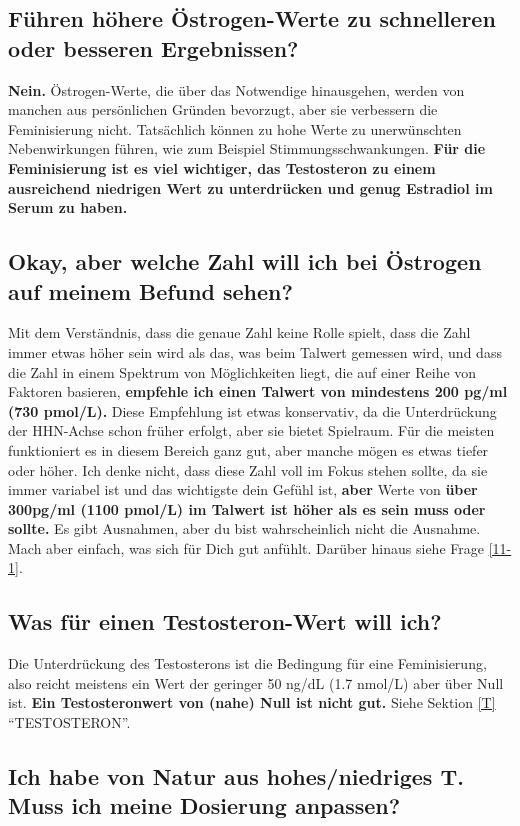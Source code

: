 \documentclass{article}
\begin{document}
\subsection{Führen höhere Östrogen-Werte zu schnelleren oder besseren Ergebnissen?}

\textbf{Nein.} Östrogen-Werte, die über das Notwendige hinausgehen, werden von manchen aus persönlichen Gründen bevorzugt, aber sie verbessern die Feminisierung nicht. Tatsächlich können zu hohe Werte zu unerwünschten Nebenwirkungen führen, wie zum Beispiel Stimmungsschwankungen. \textbf{Für die Feminisierung ist es viel wichtiger, das Testosteron zu einem ausreichend niedrigen Wert zu unterdrücken und genug Estradiol im Serum zu haben.}

\subsection{Okay, aber welche Zahl will ich bei Östrogen auf meinem Befund sehen?}

Mit dem Verständnis, dass die genaue Zahl keine Rolle spielt, dass die Zahl immer etwas höher sein wird als das, was beim Talwert gemessen wird, und dass die Zahl in einem Spektrum von Möglichkeiten liegt, die auf einer Reihe von Faktoren basieren, \textbf{empfehle ich einen Talwert von mindestens 200 pg/ml (730 pmol/L).} Diese Empfehlung ist etwas konservativ, da die Unterdrückung der HHN-Achse schon früher erfolgt, aber sie bietet Spielraum. Für die meisten funktioniert es in diesem Bereich ganz gut, aber manche mögen es etwas tiefer oder höher. Ich denke nicht, dass diese Zahl voll im Fokus stehen sollte, da sie immer variabel ist und das wichtigste dein Gefühl ist, \textbf{aber} Werte von \textbf{über 300pg/ml (1100 pmol/L) im Talwert ist höher als es sein muss oder sollte.} Es gibt Ausnahmen, aber du bist wahrscheinlich nicht die Ausnahme. Mach aber einfach, was sich für Dich gut anfühlt. Darüber hinaus siehe Frage \ref{11-1}.

\subsection{Was für einen Testosteron-Wert will ich?}

Die Unterdrückung des Testosterons ist die Bedingung für eine Feminisierung, also reicht meistens ein Wert der geringer 50 ng/dL (1.7 nmol/L) aber über Null ist. \textbf{Ein Testosteronwert von (nahe) Null ist nicht gut.} Siehe Sektion \ref{T} “TESTOSTERON”.

\subsection{Ich habe von Natur aus hohes/niedriges T. Muss ich meine Dosierung anpassen?}
\end{document}
